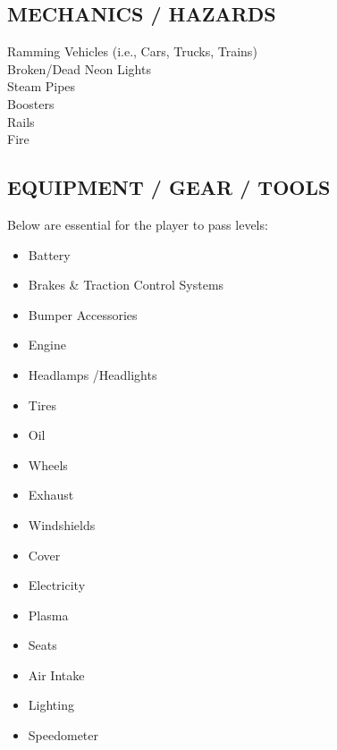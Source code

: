 \documentclass[12pt]{article}
\begin{document}
\begin{CJK}{UTF8}{min}
	\subsection*{MECHANICS / HAZARDS}
	
	\begin{multicols}{2}
		\begin{center}
			Ramming Vehicles (i.e., Cars, Trucks, Trains) \\
			Broken/Dead Neon Lights \\
			Steam Pipes \\
			Boosters \\
			Rails \\
			Fire \\
		\end{center}
	\end{multicols}
	\subsection*{EQUIPMENT / GEAR / TOOLS}
	Below are essential for the player to pass levels:
	\begin{itemize}[noitemsep]
		\item Battery
		\item Brakes \& Traction Control Systems
		\item Bumper Accessories
		\item Engine
		\item Headlamps \slash Headlights
		\item Tires
		\item Oil
		\item Wheels
		\item Exhaust
		\item Windshields
		\item Cover
		\item Electricity
		\item Plasma
		\item Seats
		\item Air Intake
		\item Lighting
		\item Speedometer
	\end{itemize}

\end{CJK}
\end{document}
